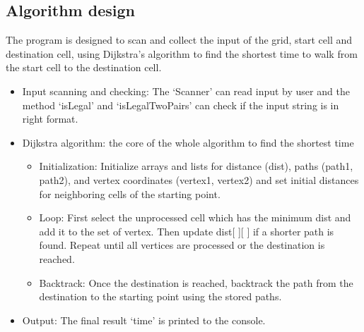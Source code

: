 \documentclass{article}
\begin{document}
\subsection{Algorithm design}
The program is designed to scan and collect the input of the grid, start cell and destination cell, using Dijkstra's algorithm to find the shortest time to walk from the start cell to the destination cell.\\
\begin{itemize}
\item Input scanning and checking: The `Scanner' can read input by user and the method `isLegal' and `isLegalTwoPairs' can check if the input string is in right format.
\item Dijkstra algorithm: the core of the whole algorithm to find the shortest time
\begin{itemize}
\item Initialization: Initialize arrays and lists for distance (dist), paths (path1, path2), and vertex coordinates (vertex1, vertex2) and set initial distances for neighboring cells of the starting point.
\item Loop: First select the unprocessed cell which has the minimum dist and add it to the set of vertex. Then update dist[ ][ ] if a shorter path is found. Repeat until all vertices are processed or the destination is reached.
\item Backtrack: Once the destination is reached, backtrack the path from the destination to the starting point using the stored paths.
\end{itemize}
\item Output: 
The final result `time' is printed to the console.
\end{itemize} 
\end{document}
